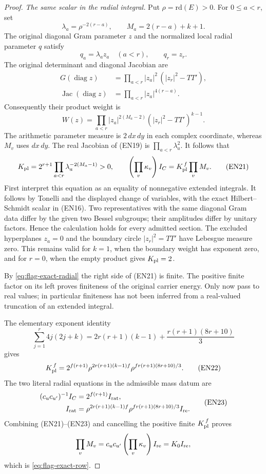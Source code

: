 \begin{proof}
\emph{The same scalar in the radial integral.}
Put \(\rho=\mathrm{rd}(E)>0\). For \(0\le a<r\), set
\[
       \lambda_a=\rho^{-2(r-a)},\qquad
       M_a=2(r-a)+k+1 .
\]
The original diagonal Gram parameter \(z\) and the
normalized local radial parameter \(q\) satisfy
\[
       q_a=\lambda_a z_a\quad(a<r),\qquad q_r=z_r .
                                                        \tag{EN19}
\]
The original determinant and diagonal Jacobian are
\[
 \begin{split}
 G(\operatorname{diag}z)
    &=\prod_{a<r}|z_a|^2\,(|z_r|^2-TT'),\\
 \operatorname{Jac}(\operatorname{diag}z)
    &=\prod_{a<r}|z_a|^{4(r-a)}.
 \end{split}
\]
Consequently their product weight is
\[
 W(z)=\prod_{a<r}|z_a|^{2(M_a-2)}
                         (|z_r|^2-TT')^{k-1}.
                                                        \tag{EN20}
\]
The arithmetic parameter measure is \(2\,dx\,dy\)
in each complex coordinate, whereas \(M_v\) uses
\(dx\,dy\). The real Jacobian of (EN19) is
\(\prod_{a<r}\lambda_a^2\). It follows that
\[
 K_{\rm pl}=2^{r+1}
              \prod_{a<r}\lambda_a^{-2(M_a-1)}>0,
 \qquad
       \left(\prod_v\kappa_v\right)I_C
                        =K_{\rm pl}^{\,f}\prod_vM_v .
                                                        \tag{EN21}
\]
First interpret this equation as an equality of
nonnegative extended integrals. It follows by Tonelli
and the displayed change of variables, with the exact
Hilbert--Schmidt scalar in (EN16). Two representatives
with the same diagonal Gram data differ by the given
two Bessel subgroups; their amplitudes differ by
unitary factors. Hence the calculation holds for
every admitted section. The excluded hyperplanes
\(z_a=0\) and the boundary circle
\(|z_r|^2=TT'\) have Lebesgue measure zero. This remains
valid for \(k=1\), when the boundary weight has exponent
zero, and for \(r=0\), when the empty product gives
\(K_{\rm pl}=2\).

By \eqref{eq:flag-exact-radial} the right side of
(EN21) is finite. The positive finite factor on its
left proves finiteness of the original carrier energy.
Only now pass to real values; in particular finiteness
has not been inferred from a real-valued truncation
of an extended integral.

The elementary exponent identity
\[
 \sum_{j=1}^r4j(2j+k)
   =2r(r+1)(k-1)+\frac{r(r+1)(8r+10)}3
\]
gives
\[
 K_{\rm pl}^{\,f}
   =2^{f(r+1)}
       \rho^{2r(r+1)(k-1)f}
       \rho^{fr(r+1)(8r+10)/3}.                         \tag{EN22}
\]
The two literal radial equations in the admissible
mass datum are
\[
 \begin{split}
 (c_uc_{u'})^{-1}I_C&=2^{f(r+1)}I_{\rm rat},\\
 I_{\rm rat}
    &=\rho^{2r(r+1)(k-1)f}
           \rho^{fr(r+1)(8r+10)/3}I_{\rm re}.
 \end{split}                                           \tag{EN23}
\]
Combining (EN21)--(EN23) and cancelling the positive
finite \(K_{\rm pl}^{\,f}\) proves
\[
      \prod_vM_v
        =c_uc_{u'}\left(\prod_v\kappa_v\right)I_{\rm re}
        =K_0I_{\rm re},
\]
which is \eqref{eq:flag-exact-row}.


\end{proof}

